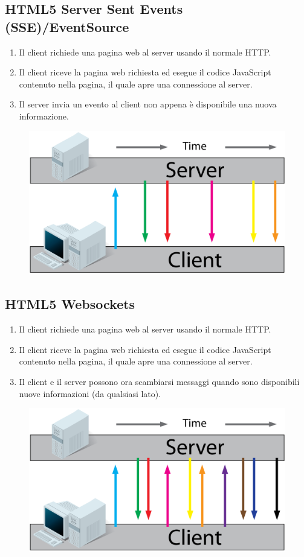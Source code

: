 \subsection{HTML5 Server Sent Events (SSE)/EventSource}
\begin{enumerate}
	\item Il client richiede una pagina web al server usando il normale HTTP.
	\item Il client riceve la pagina web richiesta ed esegue il codice JavaScript contenuto nella pagina, il quale apre una connessione al server.
	\item Il server invia un evento al client non appena è disponibile una nuova informazione.
\end{enumerate}
\begin{figure}[h]
	\centering
	\includegraphics[scale=0.4]{Immagini/server_sent_events.png}
\end{figure}
\newpage
\subsection{HTML5 Websockets}
\begin{enumerate}
	\item Il client richiede una pagina web al server usando il normale HTTP.
	\item Il client riceve la pagina web richiesta ed esegue il codice JavaScript contenuto nella pagina, il quale apre una connessione al server.
	\item Il client e il server possono ora scambiarsi messaggi quando sono disponibili nuove informazioni (da qualsiasi lato).
\end{enumerate}
\begin{figure}[h]
	\centering
	\includegraphics[scale=0.4]{Immagini/websockets.png}
\end{figure}